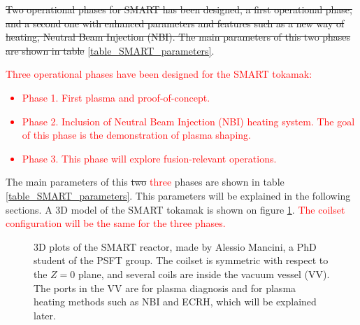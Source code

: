 \documentclass[a4paper,12pt,oneside]{book}
\begin{document}
\st{Two operational phases for SMART has been designed, a first operational phase, and a second one with enhanced parameters and features such as a new way of heating, Neutral Beam Injection (NBI). The main parameters of this two phases are shown in table } \ref{table_SMART_parameters}.

\textcolor{red}{Three operational phases have been designed for the SMART tokamak:
%
\begin{itemize}
\item Phase 1. First plasma and proof-of-concept.
\item Phase 2. Inclusion of Neutral Beam Injection (NBI) heating system. The goal of this phase is the demonstration of plasma shaping.
\item Phase 3. This phase will explore fusion-relevant operations.
\end{itemize} }
The main parameters of this \st{two} \textcolor{red}{three} phases are shown in table \ref{table_SMART_parameters}. This parameters will be explained in the following sections. A 3D model of the SMART tokamak is shown on figure \ref{fig_SMART_3D_Alessio}. \textcolor{red}{The coilset configuration will be the same for the three phases.}


\begin{figure}[htbp]
\centering
{}
\hfill
{}
\caption{3D plots of the SMART reactor, made by Alessio Mancini, a PhD student of the PSFT group. The coilset is symmetric with respect to the $Z=0$ plane, and several coils are inside the vacuum vessel (VV). The ports in the VV are for plasma diagnosis and for plasma heating methods such as NBI and ECRH, which will be explained later.}
\label{fig_SMART_3D_Alessio}
\end{figure}
\end{document}
